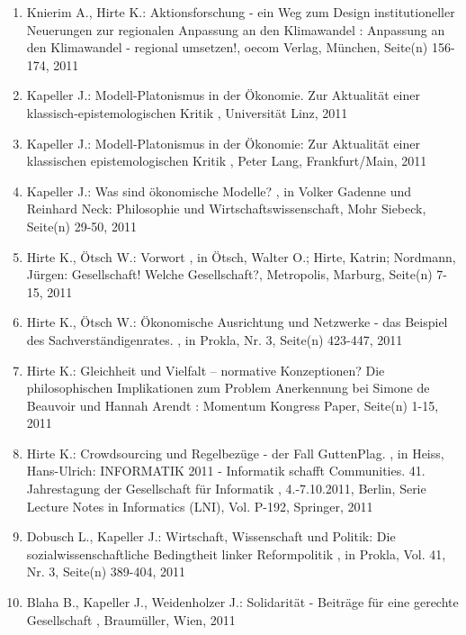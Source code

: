 \begin{enumerate}[leftmargin=*, labelsep=0.5cm]
	 \item Knierim A., Hirte K.:  Aktionsforschung - ein Weg zum Design institutioneller Neuerungen zur regionalen Anpassung an den Klimawandel  : Anpassung an den Klimawandel - regional umsetzen!, oecom Verlag, München, Seite(n) 156-174, 2011
	 \item Kapeller J.:  Modell-Platonismus in der Ökonomie. Zur Aktualität einer klassisch-epistemologischen Kritik  , Universität Linz, 2011
	 \item Kapeller J.:  Modell-Platonismus in der Ökonomie: Zur Aktualität einer klassischen epistemologischen Kritik  , Peter Lang, Frankfurt/Main, 2011
	 \item Kapeller J.:  Was sind ökonomische Modelle?  , in Volker Gadenne und Reinhard Neck: Philosophie und Wirtschaftswissenschaft, Mohr Siebeck, Seite(n) 29-50, 2011
	 \item Hirte K., Ötsch W.:  Vorwort  , in Ötsch, Walter O.; Hirte, Katrin; Nordmann, Jürgen: Gesellschaft! Welche Gesellschaft?, Metropolis, Marburg, Seite(n) 7-15, 2011
	 \item Hirte K., Ötsch W.:  Ökonomische Ausrichtung und Netzwerke - das Beispiel des Sachverständigenrates.  , in Prokla, Nr. 3, Seite(n) 423-447, 2011
	 \item Hirte K.:  Gleichheit und Vielfalt – normative Konzeptionen? Die philosophischen Implikationen zum Problem Anerkennung bei Simone de Beauvoir und Hannah Arendt  : Momentum Kongress Paper, Seite(n) 1-15, 2011
	 \item Hirte K.:  Crowdsourcing und Regelbezüge - der Fall GuttenPlag.  , in Heiss, Hans-Ulrich: INFORMATIK 2011 - Informatik schafft Communities. 41. Jahrestagung der Gesellschaft für Informatik , 4.-7.10.2011, Berlin, Serie Lecture Notes in Informatics (LNI), Vol. P-192, Springer, 2011
	 \item Dobusch L., Kapeller J.:  Wirtschaft, Wissenschaft und Politik: Die sozialwissenschaftliche Bedingtheit linker Reformpolitik  , in Prokla, Vol. 41, Nr. 3, Seite(n) 389-404, 2011
	 \item Blaha B., Kapeller J., Weidenholzer J.:  Solidarität - Beiträge für eine gerechte Gesellschaft  , Braumüller, Wien, 2011
\end{enumerate} 
